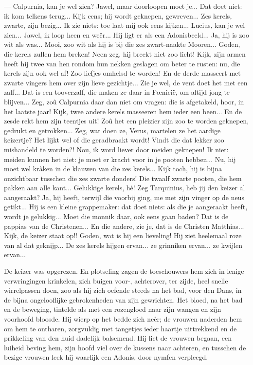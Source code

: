 \documentclass[a4paper, 12pt, oneside, dutch]{article}
\begin{document}
--- Calpurnia, kan je wel zien? Jawel, maar doorloopen moet je... Dat doet niet: ik kom telkens terug... Kijk eens; hij wordt geknepen, gewreven... Zes kerels, zwarte, zijn bezig... Ik zie niets: toe laat mij ook eens kijken... Lucius, kan je wel zien... Jawel, ik loop heen en weêr... Hij ligt er als een Adonisbeeld... Ja, hij is zoo wit als was... Mooi, zoo wit als hij is bij die zes zwart-naakte Mooren... Goden, die kerels zullen hem breken! Neen zeg, hij breekt niet zoo licht! Kijk, zijn armen heeft hij twee van hen rondom hun nekken geslagen om beter te rusten: nu, die kerels zijn ook wel af! Zoo liefjes omhelsd te worden! En de derde masseert met zwarte vingers hem over zijn lieve gezichtje... Zie je wel, de vent doet het met een zalf... Dat is een tooverzalf, die maken ze daar in Fœnicië, om altijd jong te blijven... Zeg, zoû Calpurnia daar dan niet om vragen: die is afgetakeld, hoor, in het laatste jaar! Kijk, twee andere kerels masseeren hem ieder een been... En de zesde rekt hem zijn teentjes uit! Zoû het een pleizier zijn zoo te worden geknepen, gedrukt en getrokken... Zeg, wat doen ze, Verus, martelen ze het aardige keizertje? Het lijkt wel of die geradbraakt wordt! Vindt die dat lekker zoo mishandeld te worden?! Nou, ik word liever door meiden geknepen! Ik niet: meiden kunnen het niet: je moet er kracht voor in je pooten hebben... Nu, hij moet wel kràken in de klauwen van die zes kerels... Kijk toch, hij is bijna onzichtbaar tusschen die zes zwarte donders! Die twaalf zwarte pooten, die hem pakken aan alle kant... Gelukkige kerels, hè! Zeg Tarquinius, heb jij den keizer al aangeraakt? Ja, hij heeft, terwijl die voorbij ging, me met zijn vinger op de neus getikt... Hij is een kleine grappemaker: dat doet niets: als die je aangeraakt heeft, wordt je gelukkig... Moet die monnik daar, ook eens gaan baden? Dat is de pappias van de Christenen... En die andere, zie je, dat is de Christen Matthias... Kijk, de keizer staat op!! Goden, wat is hij een lieveling! Hij ziet heelemaal roze van al dat geknijp... De zes kerels hijgen ervan... ze grinniken ervan... ze kwijlen ervan...

De keizer was opgerezen. En plotseling zagen de toeschouwers hem zich in lenige verwringingen krinkelen, zich buigen voor-, achterover, ter zijde, heel snelle wirrelpassen doen, zoo als hij zich oefende steeds na het bad, voor den Dans, in de bijna ongelooflijke gebrokenheden van zijn gewrichten. Het bloed, na het bad en de beweging, tintelde als met een rozengloed naar zijn wangen en zijn voorhoofd bloosde. Hij wierp op het bedde zich neêr; de vrouwen naderden hem om hem te ontharen, zorgvuldig met tangetjes ieder haartje uittrekkend en de prikkeling van den huid dadelijk balsemend. Hij liet de vrouwen begaan, een luiheid beving hem, zijn hoofd viel over de kussens naar achteren, en tusschen de bezige vrouwen leek hij waarlijk een Adonis, door nymfen verpleegd.
\end{document}
